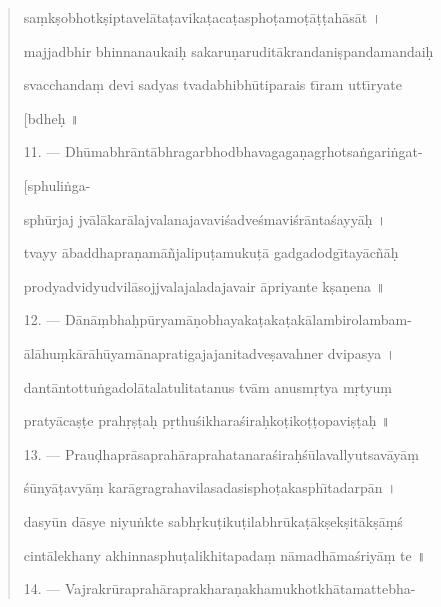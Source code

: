 \documentclass[a4paper, 11pt, oneside, french]{article}
\begin{document}
\begin{quotation}
sa\d{m}k\d{s}obhotk\d{s}iptavel\={a}ta\d{t}avika\d{t}aca\d{t}aspho\d{t}amo\d{t}\={a}\d{t}\d{t}ah\={a}s\={a}t \texthindi{।}

majjadbhir bhinnanaukai\d{h} sakaru\d{n}arudit\={a}krandani\d{s}pandamandai\d{h}

svacchanda\d{m} devi sadyas tvadabhibh\={u}tiparais t\={\i}ram utt\={\i}ryate

\hspace*{85mm}[bdhe\d{h} \texthindi{॥}

\bigskip

11. --- Dh\={u}mabhr\={a}nt\={a}bhragarbhodbhavagaga\d{n}ag\d{r}hotsa\.{n}gari\.{n}gat-

\hspace*{85mm}[sphuli\.{n}ga-

sph\={u}rjaj jv\={a}l\={a}kar\={a}lajvalanajavavi\'{s}adve\'{s}mavi\'{s}r\={a}nta\'{s}ayy\={a}\d{h} \texthindi{।}

tvayy \={a}baddhapra\d{n}am\={a}\~{n}jalipu\d{t}amuku\d{t}\={a} gadgadodg\={\i}tay\={a}c\~{n}\={a}\d{h}

prodyadvidyudvil\={a}sojjvalajaladajavair \={a}priyante k\d{s}a\d{n}ena \texthindi{॥}

\bigskip

12. --- D\={a}n\={a}\d{m}bha\d{h}p\={u}ryam\={a}\d{n}obhayaka\d{t}aka\d{t}ak\={a}lambirolambam-

\={a}l\={a}hu\d{m}k\={a}r\={a}h\={u}yam\={a}napratigajajanitadve\d{s}avahner dvipasya \texthindi{।}

dant\={a}ntottu\.{n}gadol\={a}talatulitatanus tv\={a}m anusm\d{r}tya m\d{r}tyu\d{m}

praty\={a}ca\d{s}\d{t}e prah\d{r}\d{s}\d{t}a\d{h} p\d{r}thu\'{s}ikhara\'{s}ira\d{h}ko\d{t}iko\d{t}\d{t}opavi\d{s}\d{t}a\d{h} \texthindi{॥}

\bigskip

13. --- Prau\d{d}hapr\={a}saprah\={a}raprahatanara\'{s}ira\d{h}\'{s}\={u}lavallyutsav\={a}y\={a}\d{m}

\'{s}\={u}ny\={a}\d{t}avy\={a}\d{m} kar\={a}gragrahavilasadasispho\d{t}akasph\={\i}tadarp\={a}n \texthindi{।}

dasy\={u}n d\={a}sye niyu\.{n}kte sabh\d{r}ku\d{t}iku\d{t}ilabhr\={u}ka\d{t}\={a}k\d{s}ek\d{s}it\={a}k\d{s}\={a}\d{m}\'{s}

cint\={a}lekhany akhinnasphu\d{t}alikhitapada\d{m} n\={a}madh\={a}ma\'{s}riy\={a}\d{m} te \texthindi{॥}

\bigskip

14. --- Vajrakr\={u}raprah\={a}raprakhara\d{n}akhamukhotkh\={a}tamattebha-


\end{quotation}
\end{document}

